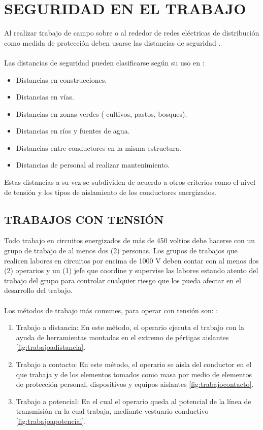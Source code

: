 \documentclass[a5paper]{book}%
\begin{document}
\chapter{SEGURIDAD EN EL TRABAJO}
Al realizar trabajo de campo sobre o al rededor de redes eléctricas de distribución como medida de protección deben usarse las distancias de seguridad \cite{RETIE2013}.\\\\

Las distancias de seguridad pueden clasificarse según su uso en :

\begin{itemize}
\item Distancias en construcciones.
\item Distancias en vías.
\item Distancias en zonas verdes ( cultivos, pastos, bosques).
\item Distancias en ríos y fuentes de agua.
\item Distancias entre conductores en la misma estructura.
\item Distancias de personal al realizar mantenimiento.
\end{itemize}

Estas distancias a su vez se subdividen de acuerdo a otros criterios como el nivel de tensión y los tipos de aislamiento de los conductores energizados.

\section{TRABAJOS CON TENSIÓN}

Todo trabajo en circuitos energizados de más de 450 voltios debe hacerse con un grupo de trabajo de al menos dos (2) personas. Los grupos de trabajos que realicen labores en circuitos por encima de 1000 V deben contar con al menos dos (2) operarios y un (1) jefe que coordine y supervise las labores estando atento del trabajo del grupo para controlar cualquier riesgo que los pueda afectar en
el desarrollo del trabajo.  \cite{RETIE2013}\\\\

Los métodos de trabajo más comunes, para operar con tensión son: \cite{RETIE2013}:

\begin{enumerate}
	\item Trabajo a distancia: En este método, el operario ejecuta
          el trabajo con la ayuda de herramientas montadas en el
          extremo de pértigas aislantes \ref{fig:trabajoadistancia}.
	\item Trabajo a contacto: En este método, el operario se aísla
          del conductor en el que trabaja y de los elementos tomados
          como masa por medio de elementos de protección personal,
          dispositivos y equipos aislantes \ref{fig:trabajocontacto}.
	\item Trabajo a potencial: En el cual el operario queda al
          potencial de la línea de transmisión en la cual trabaja,
          mediante vestuario conductivo \ref{fig:trabajoapotencial}.
        \end{enumerate}
\end{document}

